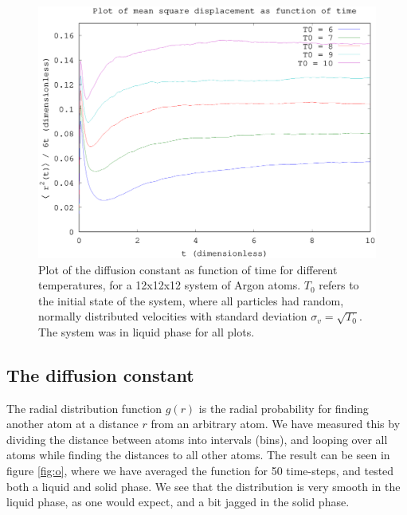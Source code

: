 \begin{figure}[h!]
    \centering
    \includegraphics[width =.70\textwidth]{bilder/n_plot01.eps}
    \parbox{4in} {
        \caption{
            \small{
                Plot of the diffusion constant as function of time for different temperatures, for a 12x12x12 system of Argon atoms. $T_0$ refers to the initial state of the system, where all particles had random, normally distributed velocities with standard deviation $\sigma_v = \sqrt{T_0}$. The system was in liquid phase for all plots.
            }
            \label{fig:n}
        }
    }
\end{figure}

\subsection*{The diffusion constant}
The radial distribution function $g(r)$ is the radial probability for finding another atom at a distance $r$ from an arbitrary atom. We have measured this by dividing the distance between atoms into intervals (bins), and looping over all atoms while finding the distances to all other atoms. The result can be seen in figure \ref{fig:o}, where we have averaged the function for 50 time-steps, and tested both a liquid and solid phase. We see that the distribution is very smooth in the liquid phase, as one would expect, and a bit jagged in the solid phase.

